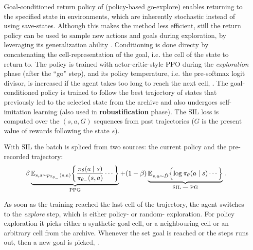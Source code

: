 \documentclass{article}
\begin{document}
Goal-conditioned return policy of \citet{ecoffet_first_2021} (policy-based go-explore)
enables returning to the specified state in environments, which are inherently stochastic
instead of using save-states. Although this makes the method less efficient, still
the return policy can be used to sample new actions and goals during exploration, by
leveraging its generalization ability \citep[p.~38]{ecoffet_first_2021}.
% 
Conditioning is done directy by concatenating the cell-representation of the goal, i.e.
the cell of the state to return to.
% 
The policy is trained with actor-critic-style PPO \citep{schulman_proximal_2017} during
the \emph{exploration} phase (after the ``go'' step), and its policy temperature, i.e.
the pre-softmax logit divisor, is increased if the agent takes too long to reach the next cell,
\citep[p.~19]{ecoffet_first_2021}.
% 
The goal-conditioned policy is trained to follow the best trajectory of states that
previously led to the selected state from the archive and also undergoes self-imitation
learning \citep{oh_self-imitation_2018} (also used in \textbf{robustification} phase).
The SIL loss is computed over the $(s, a, G)$ sequences from past trajectories ($G$ is
the present value of rewards following the state $s$).

With SIL the batch is spliced
from two sources: the current policy and the pre-recorded trajectory:
$$
    \beta \underbrace{\mathbb{E}_{s, a\sim p_{\pi_{\theta_-}}(s, a)}
            \biggl\{
                \frac{\pi_\theta(a\mid s)}{\pi_{\theta_-}(s, a)} \cdots
            \biggr\}
    }_{\text{PPG}}
    + (1 - \beta) \underbrace{
        \mathbb{E}_{s, a\sim \hat{D}}
        \Bigl\{
            \log \pi_\theta(a \mid s) \cdots
        \Bigr\}
    }_{\text{SIL --- PG}}
    \,. $$

As soon as the training reached the last cell of the trajectory, the agent switches to
the \emph{explore} step, which is either policy- or random- exploration. For policy
exploration it picks either a synthetic goal-cell, or a neighbouring cell or an arbitrary
cell from the archive. Whenever the set goal is reached or the steps runs out, then a
new goal is picked, \citep[p.~21]{ecoffet_first_2021}.
\end{document}
